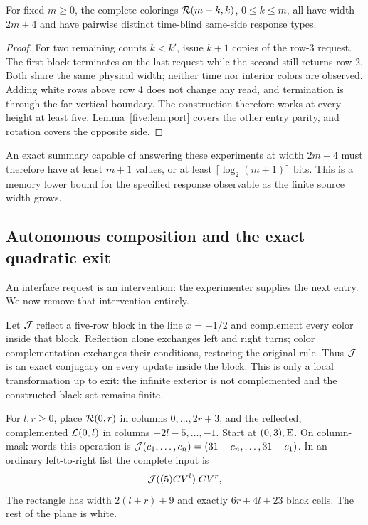 \begin{proposition}\label{five:prop:distinguish}
For fixed $m\ge0$, the complete colorings $\mathcal R(m-k,k)$, $0\le k\le m$, all have
width $2m+4$ and have pairwise distinct time-blind same-side response types.
\end{proposition}
\begin{proof}
For two remaining counts $k<k'$, issue $k+1$ copies of the row-3 request. The
first block terminates on the last request while the second still returns
row 2. Both share the same physical width; neither time nor interior colors
are observed. Adding white rows above row 4 does not change any read, and
termination is through the far vertical boundary. The construction therefore
works at every height at least five. Lemma~\ref{five:lem:port} covers the other
entry parity, and rotation covers the opposite side.
\end{proof}
An exact summary capable of answering these experiments at width $2m+4$ must
therefore have at least $m+1$ values, or at least $\lceil\log_2(m+1)\rceil$
bits. This is a memory lower bound for the specified response observable as the
finite source width grows.

\subsection{Autonomous composition and the exact quadratic exit}
An interface request is an intervention: the experimenter supplies the next
entry. We now remove that intervention entirely.

Let $\mathcal J$ reflect a five-row block in the line $x=-1/2$ and complement every
color inside that block. Reflection alone exchanges left and right turns;
color complementation exchanges their conditions, restoring the original
rule. Thus $\mathcal J$ is an exact conjugacy on every update inside the block. This
is only a local transformation up to exit: the infinite exterior is not
complemented and the constructed black set remains finite.

For $l,r\ge0$, place $\mathcal R(0,r)$ in columns $0,\ldots,2r+3$, and the reflected,
complemented $\mathcal L(0,l)$ in columns $-2l-5,\ldots,-1$. Start at $(0,3),\mathrm E$.
On column-mask words this operation is
$\mathcal J(c_1,\ldots,c_n)=(31-c_n,\ldots,31-c_1)$.
In an ordinary left-to-right list the complete input is
\begin{equation}\label{five:eq:source}
 \mathcal J((5)CV^l)\;CV^r,
\end{equation}
The rectangle has width $2(l+r)+9$ and exactly
$6r+4l+23$ black cells. The rest of the plane is white.


